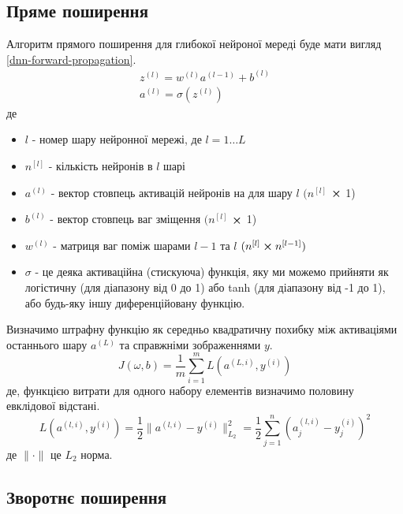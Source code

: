 \documentclass[14pt,a4paper]{extarticle}
\newcounter{e}
\numberwithin{equation}{section}
\numberwithin{figure}{section}
\newcommand{\ith}{^{(i)}}
\newcommand{\lth}{^{(l)}}
\begin{document}
	\subsection{Пряме поширення}
	Алгоритм прямого поширення для глибокої нейроної мереді буде мати вигляд \ref{dnn-forward-propagation}.
	\begin{equation}
		\label{dnn-forward-propagation}
		\begin{array}{l}
			\displaystyle
			z\lth=w^{(l)} a^{(l-1)}+b\lth
			\\[0.7cm]
			
			\displaystyle
			a\lth=\sigma (z\lth)
		\end{array}
	\end{equation}
	де
	\begin{itemize}
		\item $l$ - номер шару нейронної мережі, де $l = 1 \dotsc L$
		\item $n^{[l]}$ - кількість нейронів в $l$ шарі
		\item $a\lth$ - вектор стовпець активацій нейронів на для шару $l$ $(n^{[l]}$ $\cross$ 1)
		\item $b\lth$ - вектор стовпець ваг зміщення $(n^{[l]}$ $\cross$ 1)
		\item $w\lth$ - матриця ваг поміж шарами $l-1$ та $l$ $(n^{[l]} \cross n^{[l - 1]})$ 
		\item $\sigma$ - це деяка активаційна (стискуюча) функція, яку ми можемо прийняти як логістичну (для діапазону від 0 до 1) або tanh (для діапазону від -1 до 1), або будь-яку іншу диференційовану функцію.
	\end{itemize}
	
	Визначимо штрафну функцію як середньо квадратичну похибку між активаціями останнього шару $a^{(L)}$ та справжніми зображеннями $y$.
	\begin{equation}
		\label{cost-function}
		J(\omega, b) =  \frac{1}{m}  \sum_{i=1}^{m} L(a^{(L, i)}, y\ith)
	\end{equation}
	де, функцією витрати для одного набору елементів визначимо половину евклідової відстані.
	\begin{equation}
		\label{loss-function}
		L(a^{(l, i)}, y\ith)  =  \frac{1}{2}  \| a^{(l, i)}  - y\ith \|_{L_2}^{2} = \frac{1}{2} \sum_{j=1}^{n}  (a^{(l, i)}_j -  y\ith_j)^2
	\end{equation}
	де $\| \cdot \|$ це $L_2$ норма.

	\subsection{Зворотнє поширення}
	
\end{document}

